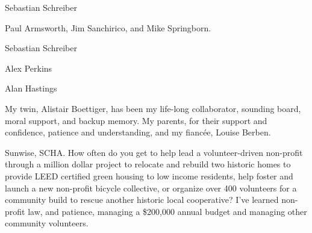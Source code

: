Sebastian Schreiber 




Paul Armsworth, Jim Sanchirico, and Mike Springborn.  



Sebastian Schreiber 

 




Alex Perkins

Alan Hastings


My twin, Alistair Boettiger, has been my life-long collaborator, sounding board, moral support, and backup memory.  My parents, for their support and confidence, patience and understanding, and my fianc\'ee, Louise Berben. 

Sunwise, SCHA.  How often do you get to help lead a volunteer-driven non-profit through a million dollar project to relocate and rebuild two historic homes to provide LEED certified green housing to low income residents, help foster and launch a new non-profit bicycle collective, or organize over 400 volunteers for a community build to rescue another historic local cooperative?  I've learned non-profit law, and patience, managing a \$200,000 annual budget and managing other community volunteers.



